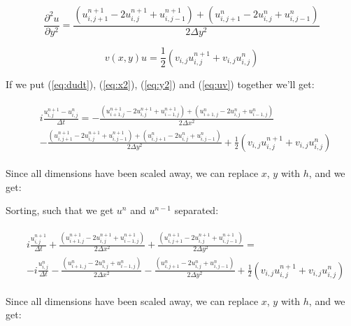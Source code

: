 \documentclass[english,notitlepage,reprint,nofootinbib]{revtex4-1}  %
\begin{document}
\begin{equation} \label{eq:y2}
    \frac{\partial^2 u}{\partial y^2} = \frac{ \left( u_{i, j+1}^{n+1} - 2u_{i, j}^{n+1} + u_{i, j-1}^{n+1} \right) + \left( u_{i, j+1}^{n} - 2u_{i, j}^{n} + u_{i, j-1}^{n} \right) }{2 \Delta y^2}
\end{equation}

\begin{equation} \label{eq:uv}
    v(x,y)u = \frac{1}{2} \left(v_{i,j} u_{i,j}^{n+1} + v_{i,j} u_{i,j}^n\right)
\end{equation}

If we put (\ref{eq:dudt}), (\ref{eq:x2}), (\ref{eq:y2}) and (\ref{eq:uv}) together we'll get:

\begin{align} \label{eq:step1}
\begin{split}
    &i \frac{u_{i,j}^{n+1} - u_{i,j}^n}{\Delta t} = - \frac{ \left( u_{i+1, j}^{n+1} - 2u_{i, j}^{n+1} + u_{i-1, j}^{n+1} \right) + \left( u_{i+1, j}^{n} - 2u_{i, j}^{n} + u_{i-1, j}^{n} \right) }{2 \Delta x^2} \\ 
    &- \frac{ \left( u_{i, j+1}^{n+1} - 2u_{i, j}^{n+1} + u_{i, j-1}^{n+1} \right) + \left( u_{i, j+1}^{n} - 2u_{i, j}^{n} + u_{i, j-1}^{n} \right) }{2 \Delta y^2} + \frac{1}{2} \left(v_{i,j} u_{i,j}^{n+1} + v_{i,j} u_{i,j}^n\right)
\end{split}
\end{align}

Since all dimensions have been scaled away, we can replace $x$, $y$ with $h$, and we get:

Sorting, such that we get $u^n$ and $u^{n-1}$ separated:

\begin{align}
\begin{split}
    &i \frac{u_{i,j}^{n+1}}{\Delta t} + \frac{\left( u_{i+1, j}^{n+1} - 2u_{i, j}^{n+1} + u_{i-1, j}^{n+1} \right)}{2 \Delta x^2} + \frac{\left( u_{i, j+1}^{n+1} - 2u_{i, j}^{n+1} + u_{i, j-1}^{n+1} \right)}{2 \Delta y^2} = \\
    &- i \frac{u_{i,j}^{n}}{\Delta t} - \frac{\left( u_{i+1, j}^{n} - 2u_{i, j}^{n} + u_{i-1, j}^{n} \right)}{2 \Delta x^2} - \frac{\left( u_{i, j+1}^{n} - 2u_{i, j}^{n} + u_{i, j-1}^{n} \right)}{2 \Delta y^2} + \frac{1}{2} \left(v_{i,j} u_{i,j}^{n+1} + v_{i,j} u_{i,j}^n\right)
\end{split}
\end{align}

Since all dimensions have been scaled away, we can replace $x$, $y$ with $h$, and we get:
\end{document}
